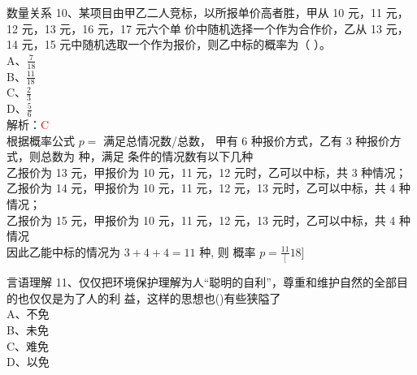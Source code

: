 \documentclass[aspectratio=169]{beamer}
\begin{document}
\begin{frame}[t]{数量关系}
    10、某项目由甲乙二人竞标，以所报单价高者胜，甲从 10 元，11 元，12 元，13 元，16 元，17 元六个单
    价中随机选择一个作为合作价，乙从 13 元，14 元，15 元中随机选取一个作为报价，则乙中标的概率为（ ）。\\
    A、$\frac{7}{18}$  \\
    B、$\frac{11}{18}$ \\
    C、$\frac{2}{3} $  \\
    D、$\frac{5}{6} $  \\
    解析：\textcolor{red}{C}\\
    根据概率公式 $p=$ 满足总情况数/总数， 甲有 6 种报价方式，乙有 3 种报价方式，则总数为 种，满足
    条件的情况数有以下几种\\
    乙报价为 13 元，甲报价为 10 元，11 元，12 元时，乙可以中标，共 3 种情况；\\
    乙报价为 14 元，甲报价为 10 元，11 元，12 元，13 元时，乙可以中标，共 4 种情况；\\
    乙报价为 15 元，甲报价为 10 元，11 元，12 元，13 元时，乙可以中标，共 4 种情况\\
    因此乙能中标的情况为 $3+4+4 = 11$ 种, 则 概率 $p=\frac{11}[18]$\\

\end{frame}



\begin{frame}[t]{言语理解}
    11、仅仅把环境保护理解为人“聪明的自利”，尊重和维护自然的全部目的也仅仅是为了人的利
    益，这样的思想也()有些狭隘了\\
    A、不免\\
    B、未免\\
    C、难免\\
    D、以免\\
\end{frame}
\end{document}
